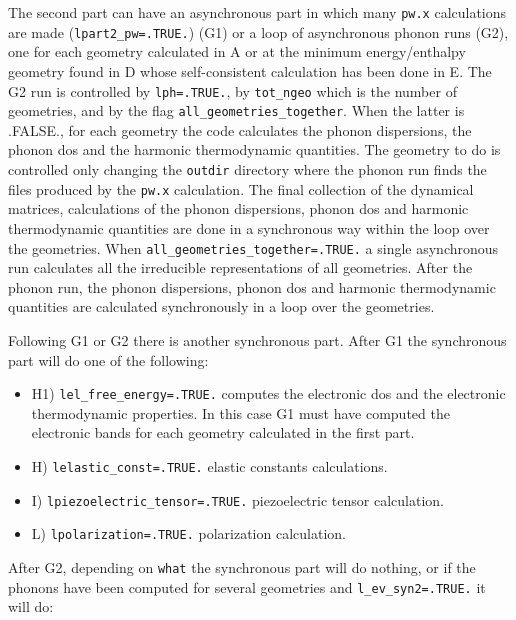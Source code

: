 \documentclass[12pt,a4paper]{article}
\begin{document}
The second part can have an asynchronous part in which
many \texttt{pw.x} calculations are made (\texttt{lpart2\_pw=.TRUE.}) (G1)
or a loop of asynchronous phonon runs (G2), one for each geometry calculated
in A or at the minimum energy/enthalpy geometry
found in D whose self-consistent calculation has been done in E.
The G2 run is controlled by \texttt{lph=.TRUE.}, by \texttt{tot\_ngeo} which 
is the number of geometries, and by the flag 
\texttt{all\_geometries\_together}. When the latter is .FALSE.,
for each geometry the code calculates the phonon dispersions, the phonon 
dos and the 
harmonic thermodynamic quantities. The geometry to do is controlled only 
changing the \texttt{outdir} directory where the phonon run finds the
files produced by the \texttt{pw.x} calculation. The final collection
of the dynamical matrices, calculations of the phonon dispersions, phonon 
dos and harmonic thermodynamic quantities are done in a synchronous way 
within the loop over the geometries.
When \texttt{all\_geometries\_together=.TRUE.} a single asynchronous run
calculates all the irreducible representations of all geometries. After
the phonon run, the phonon dispersions, phonon dos and harmonic 
thermodynamic quantities are calculated synchronously in a loop over 
the geometries.

Following G1 or G2 there is another synchronous part. 
After G1 the synchronous part will do one of the following:

\begin{itemize}

\item
H1) \texttt{lel\_free\_energy=.TRUE.} computes the electronic dos and
the electronic thermodynamic properties. In this case G1 must have
computed the electronic bands for each geometry calculated in the first part.

\item
H) \texttt{lelastic\_const=.TRUE.} elastic constants calculations.

\item
I) \texttt{lpiezoelectric\_tensor=.TRUE.} piezoelectric tensor calculation.

\item
L) \texttt{lpolarization=.TRUE.} polarization calculation.

\end{itemize}

After G2, depending on \texttt{what} the synchronous part will do nothing, 
or if the phonons have been computed for several geometries and
\texttt{l\_ev\_syn2=.TRUE.} it will do:
\end{document}
